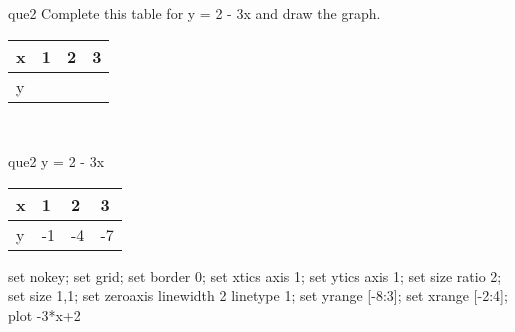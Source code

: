 \documentclass[13.5pt, varwidth=true]{beamer}
\begin{document}
\begin{frame}[shrink=19,fragile]
	\begin{beamercolorbox}[rounded=true, left, shadow=true,wd=14.8cm]{que2}
		 Complete this table for y = 2 - 3x and draw the graph. \\[0.3cm] \renewcommand{\arraystretch}{1.2}\begin{tabular}{|C|C|C|C|} \hline x & 1 & 2 & 3 \\ \hline y & & & \\ \hline \end{tabular}\\[0.3cm]
	\end{beamercolorbox}
\end{frame}
\begin{frame}[shrink=19,fragile]
	\begin{beamercolorbox}[rounded=true, left, shadow=true,wd=14.8cm]{que2}
		y = 2 - 3x\renewcommand{\arraystretch}{1.2}\begin{tabular}{|C|C|C|C|} \hline x & 1 & 2 & 3 \\ \hline y & -1 & -4 & -7\\ \hline \end{tabular}\begin{gnuplot}[terminal=pdf] set nokey; set grid; set border 0; set xtics axis 1; set ytics axis 1; set size ratio 2; set size 1,1; set zeroaxis linewidth 2 linetype 1; set yrange [-8:3]; set xrange [-2:4]; plot -3*x+2 \end{gnuplot}
	\end{beamercolorbox}
\end{frame}
\end{document}
